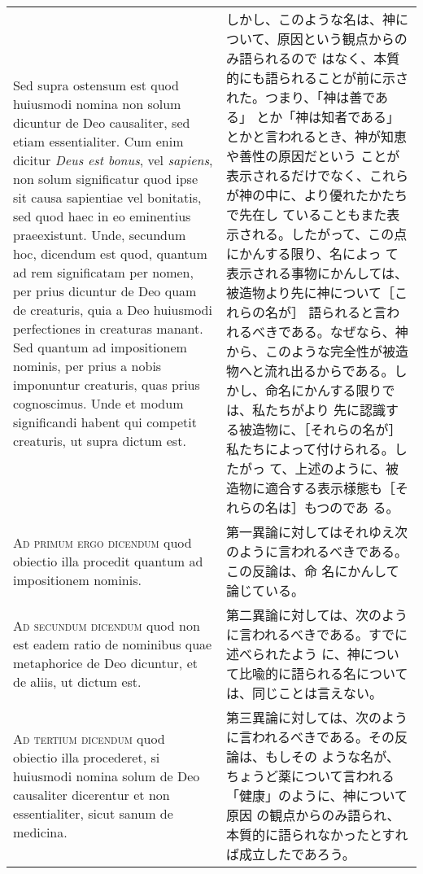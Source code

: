 \documentclass[paper=a4paper,fontsize=10pt,jafontsize=9pt,titlepage]{jlreq}
\begin{document}
\begin{longtable}{p{21em}p{21em}}
\\

Sed supra ostensum est quod huiusmodi nomina non solum dicuntur de Deo
causaliter, sed etiam essentialiter. Cum enim dicitur {\itshape Deus
est bonus}, vel {\itshape sapiens}, non solum significatur quod ipse
sit causa sapientiae vel bonitatis, sed quod haec in eo eminentius
praeexistunt. Unde, secundum hoc, dicendum est quod, quantum ad rem
significatam per nomen, per prius dicuntur de Deo quam de creaturis,
quia a Deo huiusmodi perfectiones in creaturas manant. Sed quantum ad
impositionem nominis, per prius a nobis imponuntur creaturis, quas
prius cognoscimus. Unde et modum significandi habent qui competit
creaturis, ut supra dictum est.

&

しかし、このような名は、神について、原因という観点からのみ語られるので
はなく、本質的にも語られることが前に示された。つまり、「神は善である」
とか「神は知者である」とかと言われるとき、神が知恵や善性の原因だという
ことが表示されるだけでなく、これらが神の中に、より優れたかたちで先在し
ていることもまた表示される。したがって、この点にかんする限り、名によっ
て表示される事物にかんしては、被造物より先に神について［これらの名が］
語られると言われるべきである。なぜなら、神から、このような完全性が被造
物へと流れ出るからである。しかし、命名にかんする限りでは、私たちがより
先に認識する被造物に、［それらの名が］私たちによって付けられる。したがっ
て、上述のように、被造物に適合する表示様態も［それらの名は］もつのであ
る。

\\

{\scshape Ad primum ergo dicendum} quod obiectio illa procedit quantum
ad impositionem nominis.

&

第一異論に対してはそれゆえ次のように言われるべきである。この反論は、命
名にかんして論じている。

\\

{\scshape Ad secundum dicendum} quod non est eadem ratio de nominibus
quae metaphorice de Deo dicuntur, et de aliis, ut dictum est.

&

第二異論に対しては、次のように言われるべきである。すでに述べられたよう
に、神について比喩的に語られる名については、同じことは言えない。

\\

{\scshape Ad tertium dicendum} quod obiectio illa procederet, si
huiusmodi nomina solum de Deo causaliter dicerentur et non
essentialiter, sicut sanum de medicina.

&

第三異論に対しては、次のように言われるべきである。その反論は、もしその
ような名が、ちょうど薬について言われる「健康」のように、神について原因
の観点からのみ語られ、本質的に語られなかったとすれば成立したであろう。

\end{longtable}
\newpage
{}
\end{document}
